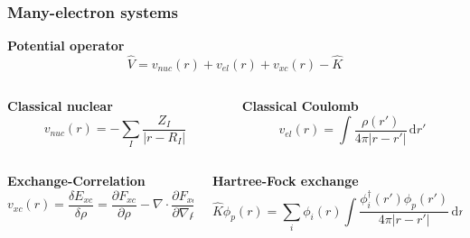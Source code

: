 \documentclass[mathserif, 10pt]{beamer}
\newcommand{\ud}{\ensuremath{\,\mathrm{d}}}
\begin{document}
\begin{frame}
    \frametitle{Many-electron systems}
    \centering
    \textbf{Potential operator}
    \begin{equation}
        \nonumber
        \hat{V} = v_{nuc}(r) + v_{el}(r) + v_{xc}(r) - \hat{K}
    \end{equation}

    \vspace{10mm}

    \begin{columns}
    \begin{column}[b]{0.5\textwidth}
    \centering
    \textbf{Classical nuclear}
    \begin{equation}
        \nonumber
	v_{nuc}(r) = -\sum_I\frac{Z_I}{|r-R_I|}
    \end{equation}
    \end{column}

    \begin{column}[b]{0.5\textwidth}
    \centering
    \textbf{Classical Coulomb}
    \begin{equation}
        \nonumber
        v_{el}(r) = \int \frac{\rho(r')}{4\pi|r-r'|} \ud r'
    \end{equation}
    \end{column}
    \end{columns}

    \vspace{5mm}

    \begin{columns}
    \begin{column}[b]{0.5\textwidth}
    \centering
    \textbf{Exchange-Correlation}
    \begin{equation}
        \nonumber
        v_{xc}(r)
        = \frac{\delta E_{xc}}{\delta \rho}
        = \frac{\partial F_{xc}}{\partial \rho} - \nabla \cdot \frac{\partial F_{xc}}{\partial \nabla\rho}
    \end{equation}
    \end{column}

    \begin{column}[b]{0.5\textwidth}
    \centering
    \textbf{Hartree-Fock exchange}
    \begin{equation}
        \nonumber
        \hat{K}\phi_p(r) = \sum_i \phi_i(r) \int \frac{\phi_i^\dagger(r')\phi_p(r')}{4\pi|r-r'|} \ud r'
    \end{equation}
    \end{column}
    \end{columns}
\end{frame}
\end{document}
